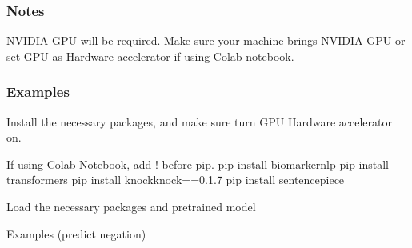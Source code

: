 \documentclass[letterpaper,10pt,english]{sphinxmanual}
\begin{document}
\begin{fulllineitems}
\subsubsection*{Notes}

\sphinxAtStartPar
NVIDIA GPU will be required. Make sure your machine brings NVIDIA GPU or set GPU as Hardware accelerator if using Colab notebook.
\subsubsection*{Examples}

\sphinxAtStartPar
Install the necessary packages, and make sure turn GPU Hardware accelerator on.

\begin{sphinxVerbatim}[commandchars=\\\{\}]
\PYGZgt{}\PYGZgt{}\PYGZgt{} If using Colab Notebook, add ! before pip.
\PYGZdl{} pip install biomarker\PYGZus{}nlp
\PYGZdl{} pip install transformers
\PYGZdl{} pip install knockknock==0.1.7
\PYGZdl{} pip install sentencepiece
\end{sphinxVerbatim}

\sphinxAtStartPar
Load the necessary packages and pre\sphinxhyphen{}trained model

\begin{sphinxVerbatim}[commandchars=\\\{\}]
   
   
   
\end{sphinxVerbatim}

\sphinxAtStartPar
Examples (predict negation)


\end{fulllineitems}
\end{document}
